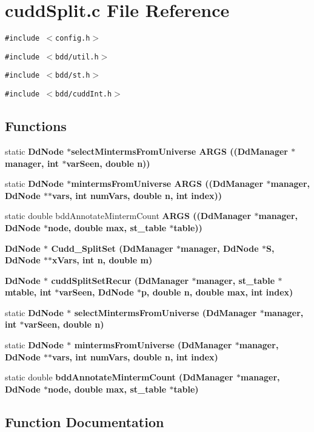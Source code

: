 \section{cudd\-Split.c File Reference}
\label{cuddSplit_8c}
{\tt \#include $<$config.h$>$}\par
{\tt \#include $<$bdd/util.h$>$}\par
{\tt \#include $<$bdd/st.h$>$}\par
{\tt \#include $<$bdd/cudd\-Int.h$>$}\par
\subsection*{Functions}
\begin{CompactItemize}
\item 
static \bf{Dd\-Node} $\ast$select\-Minterms\-From\-Universe \bf{ARGS} ((\bf{Dd\-Manager} $\ast$manager, int $\ast$var\-Seen, double n))
\item 
static \bf{Dd\-Node} $\ast$minterms\-From\-Universe \bf{ARGS} ((\bf{Dd\-Manager} $\ast$manager, \bf{Dd\-Node} $\ast$$\ast$vars, int num\-Vars, double n, int index))
\item 
static double bdd\-Annotate\-Minterm\-Count \bf{ARGS} ((\bf{Dd\-Manager} $\ast$manager, \bf{Dd\-Node} $\ast$node, double \bf{max}, \bf{st\_\-table} $\ast$table))
\item 
\bf{Dd\-Node} $\ast$ \bf{Cudd\_\-Split\-Set} (\bf{Dd\-Manager} $\ast$manager, \bf{Dd\-Node} $\ast$S, \bf{Dd\-Node} $\ast$$\ast$x\-Vars, int n, double m)
\item 
\bf{Dd\-Node} $\ast$ \bf{cudd\-Split\-Set\-Recur} (\bf{Dd\-Manager} $\ast$manager, \bf{st\_\-table} $\ast$mtable, int $\ast$var\-Seen, \bf{Dd\-Node} $\ast$p, double n, double \bf{max}, int index)
\item 
static \bf{Dd\-Node} $\ast$ \bf{select\-Minterms\-From\-Universe} (\bf{Dd\-Manager} $\ast$manager, int $\ast$var\-Seen, double n)
\item 
static \bf{Dd\-Node} $\ast$ \bf{minterms\-From\-Universe} (\bf{Dd\-Manager} $\ast$manager, \bf{Dd\-Node} $\ast$$\ast$vars, int num\-Vars, double n, int index)
\item 
static double \bf{bdd\-Annotate\-Minterm\-Count} (\bf{Dd\-Manager} $\ast$manager, \bf{Dd\-Node} $\ast$node, double \bf{max}, \bf{st\_\-table} $\ast$table)
\end{CompactItemize}


\subsection{Function Documentation}
